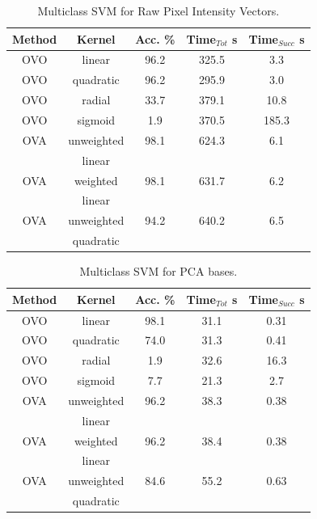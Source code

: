 \documentclass[10pt,twocolumn,letterpaper]{article}
\begin{document}
\begin{table}[H]
\begin{center}
\caption{Multiclass SVM for Raw Pixel Intensity Vectors.} \label{tab:rawsvm}
\small
\begin{tabular}{||c c c c c||}
\hline
\bf Method & \bf Kernel & \bf Acc. \% & \bf Time$_{Tot}$ s & \bf Time$_{Succ}$ s\\ [0.5ex]
\hline \hline
OVO & linear & 96.2 & 325.5 & 3.3\\ [0.5ex]
\hline
OVO & quadratic & 96.2 & 295.9 & 3.0\\ [0.5ex]
\hline
OVO & radial & 33.7 & 379.1 & 10.8\\ [0.5ex]
\hline
OVO & sigmoid & 1.9 & 370.5 & 185.3\\ [0.5ex]
\hline \hline
OVA & unweighted & 98.1 & 624.3 & 6.1\\ [0.5ex]
& linear & & &\\ [0.5ex]
\hline
OVA & weighted & 98.1 & 631.7 & 6.2\\ [0.5ex]
 & linear & & & \\ [0.5ex]
\hline
OVA & unweighted & 94.2 & 640.2 & 6.5\\ [0.5ex]
 & quadratic & & &\\ [0.5ex]
\hline
\end{tabular}
\end{center}
\end{table}

\begin{table}[H]
\begin{center}
\caption{Multiclass SVM for PCA bases.}  \label{tab:pcasvm}
\small
\begin{tabular}{||c c c c c||}
\hline
\bf Method & \bf Kernel & \bf Acc. \% & \bf Time$_{Tot}$ s & \bf Time$_{Succ}$ s\\ [0.5ex]
\hline \hline
OVO & linear & 98.1 & 31.1 & 0.31\\ [0.5ex]
\hline
OVO & quadratic & 74.0 & 31.3 & 0.41\\ [0.5ex]
\hline
OVO & radial & 1.9 & 32.6 & 16.3\\ [0.5ex]
\hline
OVO & sigmoid & 7.7 & 21.3 & 2.7\\ [0.5ex]
\hline \hline
OVA & unweighted & 96.2 & 38.3 & 0.38\\ [0.5ex]
& linear & & & \\ [0.5ex]
\hline
OVA & weighted & 96.2 & 38.4 & 0.38\\ [0.5ex]
 & linear & & & \\ [0.5ex]
\hline
OVA & unweighted & 84.6 & 55.2 & 0.63\\ [0.5ex]
 & quadratic & & & \\ [0.5ex]
\hline
\end{tabular}
\end{center}

\end{table}
\end{document}
